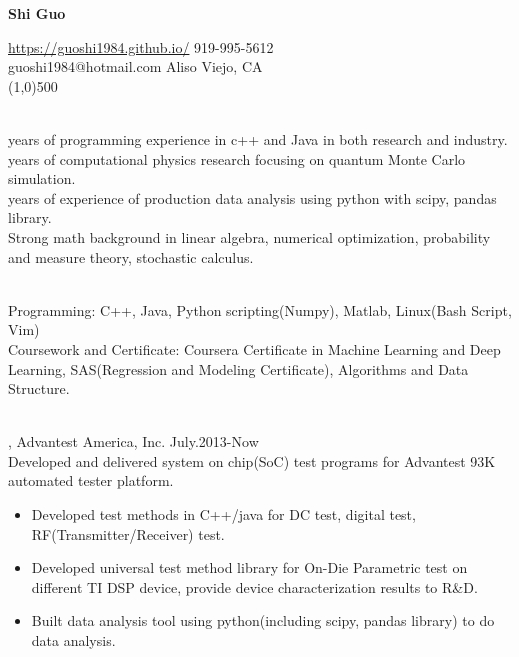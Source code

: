 \documentclass[11pt]{article} %
\begin{document}
 \centerline{\Large \bf Shi Guo}
  \noindent \url{https://guoshi1984.github.io/} \hspace{80mm}  919-995-5612\\
    guoshi1984@hotmail.com \hspace{95mm}   Aliso Viejo, CA\\
\line(1,0){500}


\vspace{1mm}

\\
 years of programming experience in c++ and Java in both research and industry.  \\
 years of computational physics research focusing on quantum Monte Carlo simulation.\\
 years of experience of production data analysis using python with scipy, pandas library.  \\
\noindent Strong math background in linear algebra, numerical optimization, probability and measure theory, stochastic calculus.  \\

\vspace{1mm}

\\
\noindent 
Programming: C++, Java, Python scripting(Numpy), Matlab,  Linux(Bash Script, Vim) \\
Coursework and Certificate: Coursera Certificate in Machine Learning and Deep Learning, SAS(Regression and Modeling Certificate), Algorithms and Data Structure. %



\vspace{2mm}

\\
, Advantest America, Inc. July.2013-Now\\
\noindent Developed and delivered system on chip(SoC) test programs for Advantest 93K automated tester platform.\\ 
\begin{itemize}
  
    \item Developed test methods in C++/java for DC test, digital test, RF(Transmitter/Receiver) test.\\
 \vspace{-4mm}
    \item  Developed universal test method library for On-Die Parametric test on different TI DSP device, provide device characterization results to R\&D.\\ 
 
  \vspace{-4mm}
 \item  Built data analysis tool using python(including scipy, pandas library) to do data analysis.

  
 \end{itemize}
\end{document}
